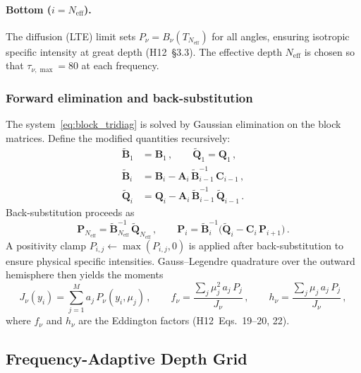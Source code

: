\paragraph{Bottom ($i=N_\mathrm{eff}$).}
The diffusion (LTE) limit sets $P_\nu = B_\nu(T_{N_\mathrm{eff}})$ for all angles, ensuring isotropic specific intensity at great depth (H12~\S3.3). The effective depth $N_\mathrm{eff}$ is chosen so that $\tau_{\nu,\max}=80$ at each frequency.

\subsubsection{Forward elimination and back-substitution}

The system~\eqref{eq:block_tridiag} is solved by Gaussian elimination on the block matrices. Define the modified quantities recursively:
\begin{align}
  \tilde{\mathbf{B}}_1 &= \mathbf{B}_1\,,\qquad
  \tilde{\mathbf{Q}}_1 = \mathbf{Q}_1\,, \\[3pt]
  \tilde{\mathbf{B}}_i &= \mathbf{B}_i
    - \mathbf{A}_i\,\tilde{\mathbf{B}}_{i-1}^{-1}\,\mathbf{C}_{i-1}\,,
    \label{eq:forward_B}\\[3pt]
  \tilde{\mathbf{Q}}_i &= \mathbf{Q}_i
    - \mathbf{A}_i\,\tilde{\mathbf{B}}_{i-1}^{-1}\,\tilde{\mathbf{Q}}_{i-1}\,.
    \label{eq:forward_Q}
\end{align}
Back-substitution proceeds as
\begin{equation}
  \mathbf{P}_{N_\mathrm{eff}} = \tilde{\mathbf{B}}_{N_\mathrm{eff}}^{-1}\,
    \tilde{\mathbf{Q}}_{N_\mathrm{eff}}\,,\qquad
  \mathbf{P}_i = \tilde{\mathbf{B}}_i^{-1}\!\bigl(
    \tilde{\mathbf{Q}}_i - \mathbf{C}_i\,\mathbf{P}_{i+1}\bigr)\,.
  \label{eq:back_sub}
\end{equation}
A positivity clamp $P_{i,j}\leftarrow\max(P_{i,j},0)$ is applied after back-substitution to ensure physical specific intensities. Gauss--Legendre quadrature over the outward hemisphere then yields the moments
\begin{equation}
  J_\nu(y_i) = \sum_{j=1}^{M} a_j\,P_\nu(y_i,\mu_j)\,,\qquad
  f_\nu = \frac{\sum_j \mu_j^2\,a_j\,P_j}{J_\nu}\,,\qquad
  h_\nu = \frac{\sum_j \mu_j\,a_j\,P_j}{J_\nu}\,,
  \label{eq:eddington_factors}
\end{equation}
where $f_\nu$ and $h_\nu$ are the Eddington factors (H12~Eqs.~19--20, 22).

\subsection{Frequency-Adaptive Depth Grid}
\label{sec:adaptive_grid}

